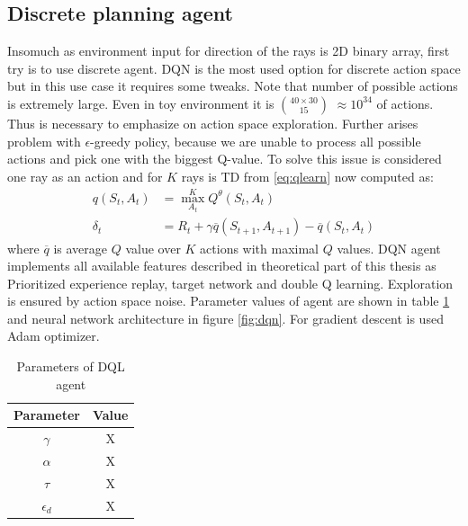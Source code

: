 \subsection{Discrete planning agent}
Insomuch as environment input for direction of the rays is 2D binary array, first try is to use discrete agent. DQN is the most used option for discrete action space but in this use case it requires some tweaks. Note that number of possible actions is extremely large. Even in toy environment it is $40\times30 \choose 15$ $\approx 10^{34}$ of actions. Thus is necessary to emphasize on action space exploration. Further arises problem with $\epsilon$-greedy policy, because we are unable to process all possible actions and pick one with the biggest Q-value. To solve this issue is considered one ray as an action and for $K$ rays is TD from \eqref{eq:qlearn} now computed as:
\begin{align}
q(S_t, A_t) &= \max\limits_{A_t}^K Q^\theta(S_t, A_t)\\
\delta_t &= R_t + \gamma \overline{q}(S_{t+1}, A_{t+1}) - \overline{q}(S_t, A_t)
\end{align}
where $\overline{q}$ is average $Q$ value over $K$ actions with maximal $Q$ values. DQN agent implements all available features described in theoretical part of this thesis as Prioritized experience replay, target network and double Q learning. Exploration is ensured by action space noise. Parameter values of agent are shown in table \ref{tab:dqlparam} and neural network architecture in figure \ref{fig:dqn}. For gradient descent is used Adam optimizer.

\begin{table}[H]
  \centering
  \begin{tabular}{*{2}{c}}
    \toprule
    Parameter & Value \\
    \midrule
    $\gamma$ & X \\
    $\alpha$ & X \\
    $\tau$ & X \\
    $\epsilon_d$ & X \\
    \bottomrule
  \end{tabular}
  \caption{Parameters of DQL agent}
  \label{tab:dqlparam}
\end{table}
\pagebreak

